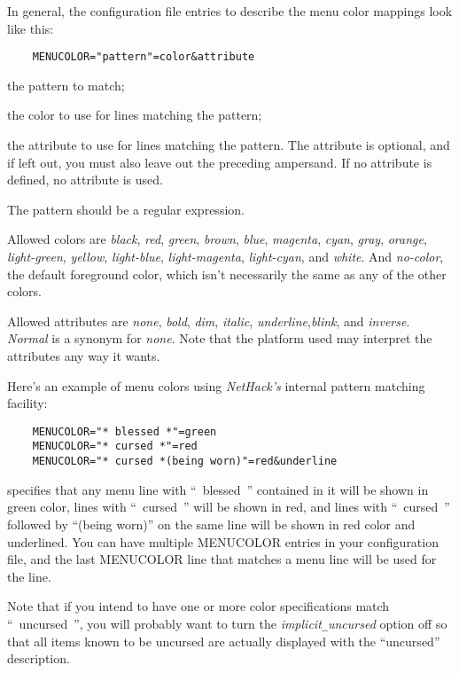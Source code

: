 In general, the configuration file entries to describe the menu color mappings
look like this:
\begin{verbatim}
    MENUCOLOR="pattern"=color&attribute
\end{verbatim}

\blist{}
\item[\ib{pattern}]
the pattern to match;
\item[\ib{color}]
the color to use for lines matching the pattern;
\item[\ib{attribute}]
the attribute to use for lines matching the pattern. The attribute is
optional, and if left out, you must also leave out the preceding ampersand.
If no attribute is defined, no attribute is used.
\elist

The pattern should be a regular expression.

Allowed colors are {\it black}, {\it red}, {\it green}, {\it brown},
{\it blue}, {\it magenta}, {\it cyan}, {\it gray}, {\it orange},
{\it light-green}, {\it yellow}, {\it light-blue}, {\it light-magenta},
{\it light-cyan}, and {\it white}.
And {\it no-color}, the default foreground color, which isn't necessarily
the same as any of the other colors.

Allowed attributes are {\it none}, {\it bold}, {\it dim}, {\it italic},
{\it underline},{\it blink}, and {\it inverse}.
{\it Normal\/} is a synonym for {\it none}.
Note that the platform used may interpret the attributes any way it
wants.

Here's an example of menu colors using {\it NetHack's\/} internal
pattern matching facility:

\begin{verbatim}
    MENUCOLOR="* blessed *"=green
    MENUCOLOR="* cursed *"=red
    MENUCOLOR="* cursed *(being worn)"=red&underline
\end{verbatim}

specifies that any menu line with ``~blessed~'' contained
in it will be shown in green color, lines with ``~cursed~'' will be
shown in red, and lines with ``~cursed~'' followed by ``(being worn)''
on the same line will be shown in red color and underlined.
You can have multiple MENUCOLOR entries in your configuration file,
and the last MENUCOLOR line that matches
a menu line will be used for the line.

Note that if you intend to have one or more color specifications match
``~uncursed~'', you will probably want to turn the
{\it implicit\verb+_+uncursed\/}
option off so that all items known to be uncursed are actually
displayed with the ``uncursed'' description.

